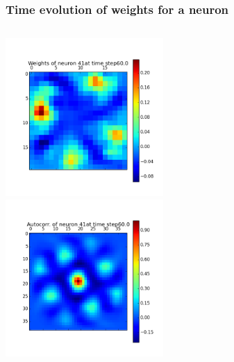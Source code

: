 \begin{frame}
\frametitle{Time evolution of weights for a neuron}
\begin{columns}[t]
\centering
\includegraphics[width=6cm,height=6cm]{neurons/neuron_w_41_t_60.png}\\
\centering
\includegraphics[width=6cm,height=6cm]{neurons/neuron_a_41_t_60.png}\\
\end{columns}
\end{frame}

